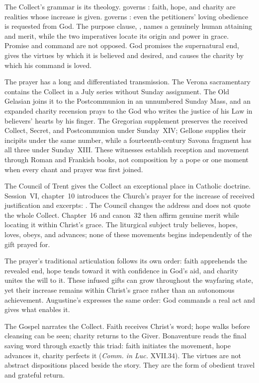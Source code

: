 The Collect's grammar is its theology.  governs :
faith, hope, and charity are realities whose increase is given. 
governs : even the petitioners' loving obedience is requested
from God. The purpose clause, , names
a genuinely human attaining and merit, while the two imperatives locate its
origin and power in grace. Promise and command are not opposed. God promises
the supernatural end, gives the virtues by which it is believed and desired,
and causes the charity by which his command is loved.

The prayer has a long and differentiated transmission. The Verona sacramentary
contains the Collect in a July series without Sunday assignment. The Old
Gelasian joins it to the Postcommunion in an unnumbered Sunday Mass, and an
expanded charity recension prays to the God who writes the justice of his Law
in believers' hearts by his finger. The Gregorian supplement preserves the
received Collect, Secret, and Postcommunion under Sunday~XIV; Gellone supplies
their incipits under the same number, while a fourteenth-century Savona fragment
has all three under Sunday~XIII. These witnesses establish reception and
movement through Roman and Frankish books, not composition by a pope or one
moment when every chant and prayer was first joined.

The Council of Trent gives the Collect an exceptional place in Catholic
doctrine. Session~VI, chapter~10 introduces the Church's prayer for the
increase of received justification and excerpts: . The Council changes the address and does
not quote the whole Collect. Chapter~16 and canon~32 then affirm genuine merit
while locating it within Christ's grace. The liturgical subject truly believes,
hopes, loves, obeys, and advances; none of these movements begins independently
of the gift prayed for.

The prayer's traditional articulation follows its own order: faith apprehends
the revealed end, hope tends toward it with confidence in God's aid, and
charity unites the will to it. These infused gifts can grow throughout the
wayfaring state, yet their increase remains within Christ's grace rather than
an autonomous achievement. Augustine's 
expresses the same order: God commands a real act and gives what enables it.

The Gospel narrates the Collect. Faith receives Christ's word; hope walks
before cleansing can be seen; charity returns to the Giver. Bonaventure reads
the final saving word through exactly this triad: faith initiates the movement,
hope advances it, charity perfects it (\emph{Comm. in Luc.} XVII.34). The
virtues are not abstract dispositions placed beside the story. They are the
form of obedient travel and grateful return.

